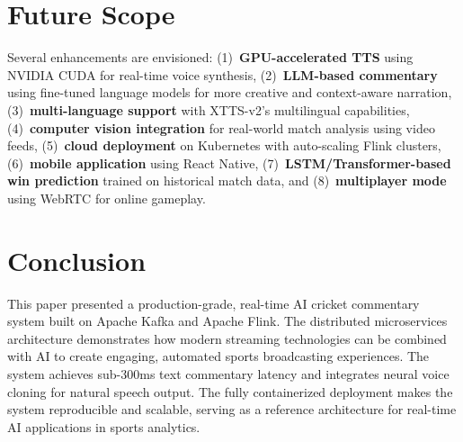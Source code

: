 \documentclass[conference]{IEEEtran}
\begin{document}
\section{Future Scope}

Several enhancements are envisioned: (1)~\textbf{GPU-accelerated TTS} using NVIDIA CUDA for real-time voice synthesis, (2)~\textbf{LLM-based commentary} using fine-tuned language models for more creative and context-aware narration, (3)~\textbf{multi-language support} with XTTS-v2's multilingual capabilities, (4)~\textbf{computer vision integration} for real-world match analysis using video feeds, (5)~\textbf{cloud deployment} on Kubernetes with auto-scaling Flink clusters, (6)~\textbf{mobile application} using React Native, (7)~\textbf{LSTM/Transformer-based win prediction} trained on historical match data, and (8)~\textbf{multiplayer mode} using WebRTC for online gameplay.

\section{Conclusion}

This paper presented a production-grade, real-time AI cricket commentary system built on Apache Kafka and Apache Flink. The distributed microservices architecture demonstrates how modern streaming technologies can be combined with AI to create engaging, automated sports broadcasting experiences. The system achieves sub-300ms text commentary latency and integrates neural voice cloning for natural speech output. The fully containerized deployment makes the system reproducible and scalable, serving as a reference architecture for real-time AI applications in sports analytics.
\end{document}
